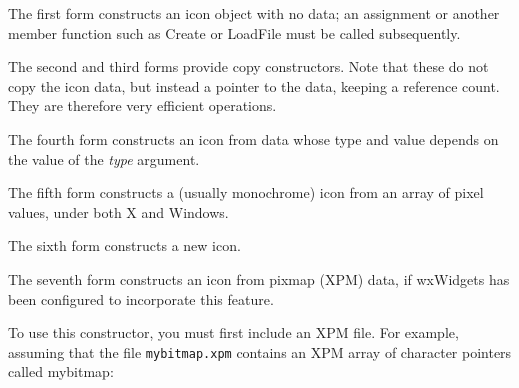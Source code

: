 


The first form constructs an icon object with no data; an assignment or another member function such as Create
or LoadFile must be called subsequently.

The second and third forms provide copy constructors. Note that these do not copy the
icon data, but instead a pointer to the data, keeping a reference count. They are therefore
very efficient operations.

The fourth form constructs an icon from data whose type and value depends on
the value of the {\it type} argument.

The fifth form constructs a (usually monochrome) icon from an array of pixel values, under both
X and Windows.

The sixth form constructs a new icon.

The seventh form constructs an icon from pixmap (XPM) data, if wxWidgets has been configured
to incorporate this feature.

To use this constructor, you must first include an XPM file. For
example, assuming that the file {\tt mybitmap.xpm} contains an XPM array
of character pointers called mybitmap:


